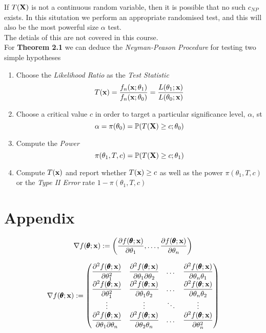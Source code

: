 \documentclass[11pt,a4paper]{article}
\begin{document}
If $T(\textbf{X})$ is not a continuous random variable, then it is possible that no such $c_{NP}$ exists. In this situtation we perform an appropriate randomised test, and this will also be the most powerful size $\alpha$ test. \\
\nb The detials of this are not covered in this course.\\

For \textbf{Theorem 2.1} we can deduce the \textit{Neyman-Peason Procedure} for testing two simple hypotheses
\begin{enumerate}[label=\roman*)]
	\item Choose the \textit{Likelihood Ratio} as the \textit{Test Statistic}
	$$T(\textbf{x})=\frac{f_n(\textbf{x};\theta_1)}{f_n(\textbf{x};\theta_0)}=\frac{L(\theta_1;\textbf{x})}{L(\theta_0;\textbf{x})}$$
	\item Choose a critical value $c$ in order to target a particular significance level, $\alpha$, st
	$$\alpha=\pi(\theta_0)=\mathbb{P}(T(\textbf{X})\geq c;\theta_0)$$
	\item Compute the \textit{Power}
	$$\pi(\theta_1,T,c)=\mathbb{P}(T(\textbf{X})\geq c;\theta_1)$$
	\item Compute $T(\textbf{x})$ and report whether $T(\textbf{x})\geq c$ as well as the power $\pi(\theta_1,T,c)$ or the \textit{Type II Error} rate $1-\pi(\theta_1,T,c)$
\end{enumerate}


\newpage
\setcounter{section}{-1}
\section{Appendix}

$$\nabla f(\pmb{\theta};\textbf{x}):=\left(\dfrac{\partial f(\pmb{\theta};\textbf{x})}{\partial\theta_1},\dots,\dfrac{\partial f(\pmb{\theta};\textbf{x})}{\partial\theta_n}\right)$$

$$\nabla f(\pmb{\theta};\textbf{x}):=\begin{pmatrix}
\dfrac{\partial^2 f(\pmb{\theta};\textbf{x})}{\partial\theta_1^2}&\dfrac{\partial^2 f(\pmb{\theta};\textbf{x})}{\partial\theta_1\partial\theta_2}&\dots&\dfrac{\partial^2 f(\pmb{\theta};\textbf{x})}{\partial\theta_n\theta_1}\\
\dfrac{\partial^2 f(\pmb{\theta};\textbf{x})}{\partial\theta_1^2}&\dfrac{\partial^2 f(\pmb{\theta};\textbf{x})}{\partial\theta_1\theta_2}&\dots&\dfrac{\partial^2 f(\pmb{\theta};\textbf{x})}{\partial\theta_n\theta_2}\\
\vdots&\vdots&\ddots&\vdots\\
\dfrac{\partial^2 f(\pmb{\theta};\textbf{x})}{\partial\theta_1\partial\theta_n}&\dfrac{\partial^2 f(\pmb{\theta};\textbf{x})}{\partial\theta_2\theta_n}&\dots&\dfrac{\partial^2 f(\pmb{\theta};\textbf{x})}{\partial\theta_n^2}
\end{pmatrix}$$
\end{document}
